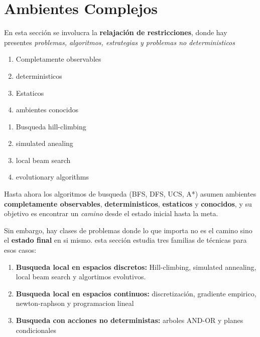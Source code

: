 \section{Ambientes Complejos}
En esta sección se involucra la \textbf{relajación de restricciones}, donde hay presentes \emph{problemas, algoritmos, estrategias y problemas no deterministicos}
\begin{definition}
    \begin{enumerate}
        \item Completamente observables
        \item deterministicos
        \item Estaticos
        \item ambientes conocidos
    \end{enumerate}
\end{definition}


\begin{definition}
    \begin{enumerate}
        \item Busqueda hill-climbing
        \item simulated anealing
        \item local beam search
        \item evolutionary algorithms
    \end{enumerate}
\end{definition}

Hasta ahora los algoritmos de busqueda (BFS, DFS, UCS, A*) asumen ambientes \textbf{completamente observables}, 
\textbf{deterministicos}, \textbf{estaticos} y \textbf{conocidos}, y su objetivo es encontrar un \emph{camino} desde el estado inicial hasta la meta.

Sin embargo, hay clases de problemas donde lo que importa no es el camino sino el \textbf{estado final} en si mismo. esta sección 
estudia tres familias de técnicas para esos casos:
\begin{enumerate}
    \item \textbf{Busqueda local en espacios discretos:} Hill-climbing, simulated annealing, local beam search y algortimos evolutivos.
    \item \textbf{Busqueda local en espacios continuos:} discretización, gradiente empirico, newton-raphson y programacion lineal
    \item \textbf{Busqueda con acciones no deterministas:} arboles AND-OR y planes condicionales
\end{enumerate}

